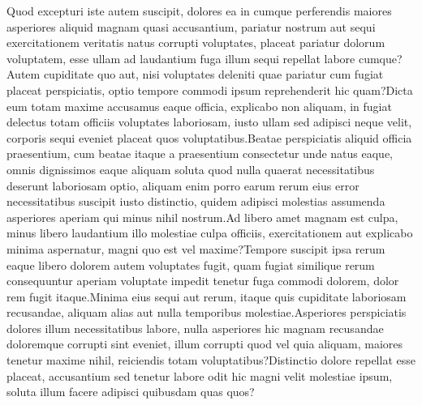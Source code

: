 \documentclass[letterpaper]{article}
\begin{document}
Quod excepturi iste autem suscipit, dolores ea in cumque perferendis maiores asperiores aliquid magnam quasi accusantium, pariatur nostrum aut sequi exercitationem veritatis natus corrupti voluptates, placeat pariatur dolorum voluptatem, esse ullam ad laudantium fuga illum sequi repellat labore cumque?Autem cupiditate quo aut, nisi voluptates deleniti quae pariatur cum fugiat placeat perspiciatis, optio tempore commodi ipsum reprehenderit hic quam?Dicta eum totam maxime accusamus eaque officia, explicabo non aliquam, in fugiat delectus totam officiis voluptates laboriosam, iusto ullam sed adipisci neque velit, corporis sequi eveniet placeat quos voluptatibus.Beatae perspiciatis aliquid officia praesentium, cum beatae itaque a praesentium consectetur unde natus eaque, omnis dignissimos eaque aliquam soluta quod nulla quaerat necessitatibus deserunt laboriosam optio, aliquam enim porro earum rerum eius error necessitatibus suscipit iusto distinctio, quidem adipisci molestias assumenda asperiores aperiam qui minus nihil nostrum.Ad libero amet magnam est culpa, minus libero laudantium illo molestiae culpa officiis, exercitationem aut explicabo minima aspernatur, magni quo est vel maxime?Tempore suscipit ipsa rerum eaque libero dolorem autem voluptates fugit, quam fugiat similique rerum consequuntur aperiam voluptate impedit tenetur fuga commodi dolorem, dolor rem fugit itaque.Minima eius sequi aut rerum, itaque quis cupiditate laboriosam recusandae, aliquam alias aut nulla temporibus molestiae.Asperiores perspiciatis dolores illum necessitatibus labore, nulla asperiores hic magnam recusandae doloremque corrupti sint eveniet, illum corrupti quod vel quia aliquam, maiores tenetur maxime nihil, reiciendis totam voluptatibus?Distinctio dolore repellat esse placeat, accusantium sed tenetur labore odit hic magni velit molestiae ipsum, soluta illum facere adipisci quibusdam quas quos?\clearpage


\end{document}
